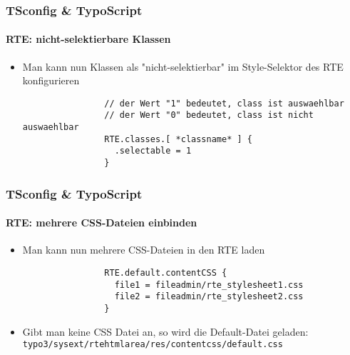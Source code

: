 
\begin{frame}[fragile]
	\frametitle{TSconfig \& TypoScript}
	\framesubtitle{RTE: nicht-selektierbare Klassen}

	\begin{itemize}
		\item Man kann nun Klassen als "nicht-selektierbar" im Style-Selektor des RTE konfigurieren

			\begin{lstlisting}
				// der Wert "1" bedeutet, class ist auswaehlbar
				// der Wert "0" bedeutet, class ist nicht auswaehlbar
				RTE.classes.[ *classname* ] {
				  .selectable = 1
				}
			\end{lstlisting}

	\end{itemize}

\end{frame}


\begin{frame}[fragile]
	\frametitle{TSconfig \& TypoScript}
	\framesubtitle{RTE: mehrere CSS-Dateien einbinden}

	\begin{itemize}
		\item Man kann nun mehrere CSS-Dateien in den RTE laden

			\begin{lstlisting}
				RTE.default.contentCSS {
				  file1 = fileadmin/rte_stylesheet1.css
				  file2 = fileadmin/rte_stylesheet2.css
				}
			\end{lstlisting}

		\item Gibt man keine CSS Datei an, so wird die Default-Datei geladen:\newline
			\texttt{typo3/sysext/rtehtmlarea/res/contentcss/default.css}
	\end{itemize}

\end{frame}

